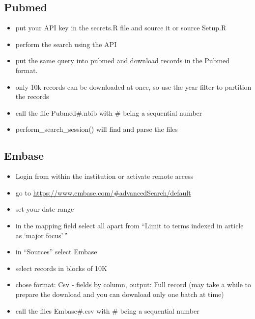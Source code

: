 \documentclass[
]{article}
\providecommand{\tightlist}{%
  \setlength{\itemsep}{0pt}\setlength{\parskip}{0pt}}
\begin{document}
\hypertarget{pubmed}{%
\subsection{Pubmed}\label{pubmed}}

\begin{itemize}
\tightlist
\item
  put your API key in the secrets.R file and source it or source Setup.R
\item
  perform the search using the API
\item
  put the same query into pubmed and download records in the Pubmed
  format.
\item
  only 10k records can be downloaded at once, so use the year filter to
  partition the records
\item
  call the file Pubmed\#.nbib with \# being a sequential number
\item
  perform\_search\_session() will find and parse the files
\end{itemize}

\hypertarget{embase}{%
\subsection{Embase}\label{embase}}

\begin{itemize}
\tightlist
\item
  Login from within the institution or activate remote access
\item
  go to \url{https://www.embase.com/\#advancedSearch/default}
\item
  set your date range
\item
  in the mapping field select all apart from ``Limit to terms indexed in
  article as `major focus'\,''
\item
  in ``Sources'' select Embase
\item
  select records in blocks of 10K
\item
  chose format: Csv - fields by column, output: Full record (may take a
  while to prepare the download and you can download only one batch at
  time)
\item
  call the files Embase\#.csv with \# being a sequential number
\end{itemize}
\end{document}
